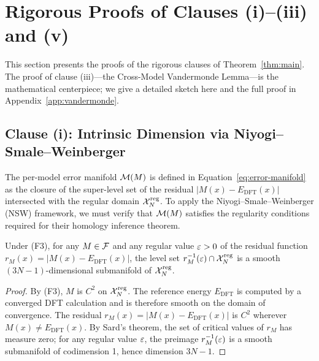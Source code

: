 \section{Rigorous Proofs of Clauses (i)--(iii) and (v)}\label{sec:proofs}

This section presents the proofs of the rigorous clauses of Theorem~\ref{thm:main}. The proof of clause (iii)---the Cross-Model Vandermonde Lemma---is the mathematical centerpiece; we give a detailed sketch here and the full proof in Appendix~\ref{app:vandermonde}.

\subsection{Clause (i): Intrinsic Dimension via Niyogi--Smale--Weinberger}\label{sec:proof-i}

The per-model error manifold $\cM(M)$ is defined in Equation~\eqref{eq:error-manifold} as the closure of the super-level set of the residual $|M(x) - E_{\text{DFT}}(x)|$ intersected with the regular domain $\mathcal{X}_N^{\text{reg}}$. To apply the Niyogi--Smale--Weinberger (NSW) framework\cite{niyogi2008finding}, we must verify that $\cM(M)$ satisfies the regularity conditions required for their homology inference theorem.

\begin{lemma}[Regularity of $\cM(M)$]\label{lem:regularity}
Under (F3), for any $M \in \mathcal{F}$ and any regular value $\varepsilon > 0$ of the residual function $r_M(x) = |M(x) - E_{\text{DFT}}(x)|$, the level set $r_M^{-1}(\varepsilon) \cap \mathcal{X}_N^{\text{reg}}$ is a smooth $(3N-1)$-dimensional submanifold of $\mathcal{X}_N^{\text{reg}}$.
\end{lemma}

\begin{proof}
By (F3), $M$ is $C^2$ on $\mathcal{X}_N^{\text{reg}}$. The reference energy $E_{\text{DFT}}$ is computed by a converged DFT calculation and is therefore smooth on the domain of convergence. The residual $r_M(x) = |M(x) - E_{\text{DFT}}(x)|$ is $C^2$ wherever $M(x) \neq E_{\text{DFT}}(x)$. By Sard's theorem, the set of critical values of $r_M$ has measure zero; for any regular value $\varepsilon$, the preimage $r_M^{-1}(\varepsilon)$ is a smooth submanifold of codimension 1, hence dimension $3N-1$.
\end{proof}

